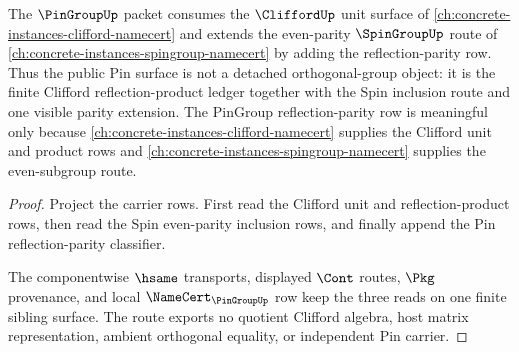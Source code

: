 \begin{theorem}
\label{thm:pingroup-spin-clifford-route}
The $\PinGroupUp$ packet consumes the $\CliffordUp$ unit surface of \autoref{ch:concrete-instances-clifford-namecert} and extends the even-parity $\SpinGroupUp$ route of \autoref{ch:concrete-instances-spingroup-namecert} by adding the reflection-parity row. Thus the public Pin surface is not a detached orthogonal-group object: it is the finite Clifford reflection-product ledger together with the Spin inclusion route and one visible parity extension.
The PinGroup reflection-parity row is meaningful only because \autoref{ch:concrete-instances-clifford-namecert} supplies the Clifford unit and product rows and \autoref{ch:concrete-instances-spingroup-namecert} supplies the even-subgroup route.
\end{theorem}

\begin{proof}
Project the carrier rows. First read the Clifford unit and reflection-product rows, then read the Spin even-parity inclusion rows, and finally append the Pin reflection-parity classifier.

The componentwise $\hsame$ transports, displayed $\Cont$ routes, $\Pkg$ provenance, and local $\NameCert_{\PinGroupUp}$ row keep the three reads on one finite sibling surface. The route exports no quotient Clifford algebra, host matrix representation, ambient orthogonal equality, or independent Pin carrier.
\end{proof}
